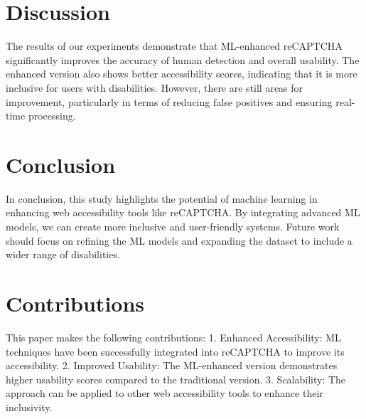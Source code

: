 \documentclass{article}
\begin{document}
\section{Discussion}
The results of our experiments demonstrate that ML-enhanced reCAPTCHA significantly improves the accuracy of human detection and overall usability. The enhanced version also shows better accessibility scores, indicating that it is more inclusive for users with disabilities. However, there are still areas for improvement, particularly in terms of reducing false positives and ensuring real-time processing.

\section{Conclusion}
In conclusion, this study highlights the potential of machine learning in enhancing web accessibility tools like reCAPTCHA. By integrating advanced ML models, we can create more inclusive and user-friendly systems. Future work should focus on refining the ML models and expanding the dataset to include a wider range of disabilities.

\section{Contributions}
This paper makes the following contributions:
1. Enhanced Accessibility: ML techniques have been successfully integrated into reCAPTCHA to improve its accessibility.
2. Improved Usability: The ML-enhanced version demonstrates higher usability scores compared to the traditional version.
3. Scalability: The approach can be applied to other web accessibility tools to enhance their inclusivity.
\end{document}
